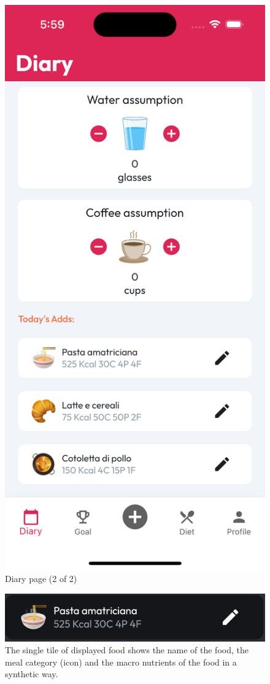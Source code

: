 \documentclass{Configuration_Files/PoliMi3i_thesis}
\begin{document}
\begin{figure}[!h]
    \includegraphics[scale=0.1]{Images/Screenshots/Mobile/Diary2Light.png}
    \caption{Diary page (2 of 2)}
\end{figure}

\begin{figure}[!h]
    \centering
    \includegraphics[scale=0.7]{Images/Screenshots/Mobile/DiaryFoodItem.png}
    \caption{The single tile of displayed food shows the name of the food, the meal category (icon) and the macro nutrients of the food in a synthetic way.}
\end{figure}
\end{document}
